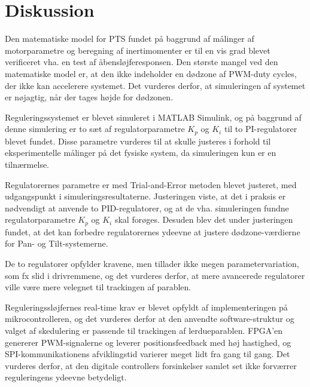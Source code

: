\section{Diskussion}
\label{sec:diskussion}
Den matematiske model for PTS fundet på baggrund af
målinger af motorparametre og beregning af inertimomenter
er til en vis grad blevet verificeret vha. en test af åbensløjferesponsen.
Den største mangel ved den matematiske model er, at den ikke indeholder en dødzone
af PWM-duty cycles, der ikke kan accelerere systemet. Det vurderes derfor,
at simuleringen af systemet er nøjagtig, når der tages højde for dødzonen.

Reguleringssystemet er blevet simuleret i MATLAB Simulink, og på baggrund af denne simulering
er to sæt af regulatorparametre \(K_p\) og \(K_i\) til to PI-regulatorer blevet fundet. Disse parametre vurderes til at skulle justeres
i forhold til eksperimentelle målinger på det fysiske system, da simuleringen kun er en tilnærmelse.

Regulatorernes parametre er med Trial-and-Error metoden blevet justeret,
med udgangspunkt i simuleringsresultaterne.
Justeringen viste, at det i praksis er nødvendigt at anvende to PID-regulatorer,
og at de vha. simuleringen fundne regulatorparametre \(K_p\) og \(K_i\) skal forøges.
Desuden blev det under justeringen fundet, at det kan forbedre regulatorernes ydeevne
at justere dødzone-værdierne for Pan- og Tilt-systemerne.

De to regulatorer opfylder kravene, men tillader ikke megen parametervariation,
som fx slid i drivremmene,
og det vurderes derfor, at mere avancerede regulatorer ville være mere velegnet til trackingen
af parablen.

Reguleringssløjfernes real-time krav er blevet opfyldt af implementeringen på mikrocontrolleren,
og det vurderes derfor at den anvendte software-struktur og valget af skedulering
er passende til trackingen af lerdueparablen.
FPGA'en genererer PWM-signalerne og leverer positionsfeedback med høj hastighed,
og SPI-kommunikationens afviklingstid varierer meget lidt fra gang til gang.
Det vurderes derfor, at den digitale controllers forsinkelser samlet set ikke forværrer
reguleringens ydeevne betydeligt.
